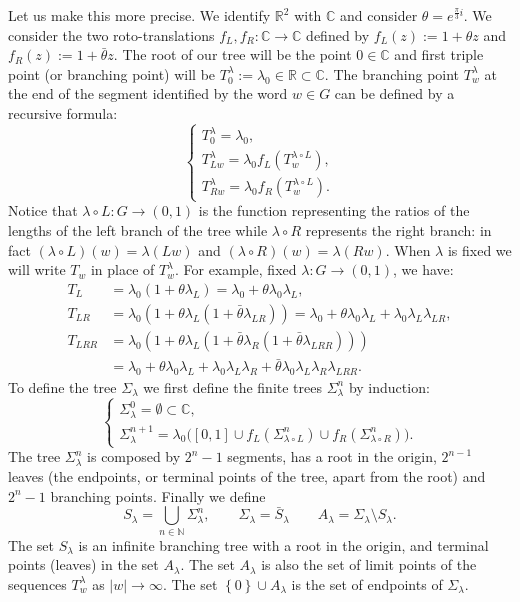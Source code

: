 \documentclass{amsart}
\newcommand{\RR}{\mathbb R}
\newcommand{\CC}{\mathbb C}
\newcommand{\NN}{\mathbb N}
\newcommand{\abs}[1]{\left\vert #1 \right\vert}
\newcommand{\ENCLOSE}[1]{\left\{#1\right\}}
\theoremstyle{definition}
\theoremstyle{remark}
\begin{document}
{Let us make this more precise.
We identify $\RR^2$ with $\CC$ and consider $\theta=e^{\frac{\pi}{3}i}$.
We consider the two roto-translations $f_L,f_R\colon \CC\to \CC$ defined by 
$f_L(z):= 1+\theta z$ and $f_R(z):=1+\bar\theta z$.
The root of our tree will be the point $0\in \CC$ and first triple point (or branching point) will be 
$T_0^\lambda:=\lambda_0\in \RR\subset \CC$. 
The branching point $T_w^\lambda$ at the end of the segment identified by the word $w\in G$ can be defined by a recursive formula:
\[
   \begin{cases}
    T_0^\lambda = \lambda_0, \\
    T_{Lw}^\lambda = \lambda_0 f_L(T_w^{\lambda\circ L}), \\
    T_{Rw}^\lambda = \lambda_0 f_R(T_w^{\lambda\circ L}).
   \end{cases}
\]
Notice that $\lambda\circ L\colon G \to (0,1)$ is the function representing the ratios of the lengths of the left branch of the tree 
while $\lambda\circ R$ represents the right branch: 
in fact $(\lambda\circ L)(w) = \lambda(Lw)$ and $(\lambda\circ R)(w) = \lambda(Rw)$.
When $\lambda$ is fixed we will write $T_w$ in place of $T_w^\lambda$.
For example, fixed $\lambda\colon G\to(0,1)$, we have: 
\begin{align*}
  T_L &= \lambda_0 (1+\theta \lambda_L) = \lambda_0+\theta \lambda_0\lambda_L,\\
  T_{LR} &= \lambda_0(1+\theta\lambda_L(1+\bar \theta\lambda_{LR})) 
    = \lambda_0 + \theta \lambda_0\lambda_L + \lambda_0\lambda_L\lambda_{LR},\\
  T_{LRR} &= \lambda_0 (1+ \theta \lambda_L(1+\bar \theta \lambda_R(1+\bar \theta \lambda_{LRR}))) \\
    &= \lambda_0 + \theta \lambda_0\lambda_L + \lambda_0\lambda_L\lambda_R + \bar\theta \lambda_0\lambda_L\lambda_R\lambda_{LRR}.
\end{align*}
To define the tree $\Sigma_\lambda$ we first define the finite trees $\Sigma_\lambda^n$ by induction:
\[
\begin{cases}
  \Sigma_\lambda^0 = \emptyset \subset \CC, \\
  \Sigma_\lambda^{n+1} = \lambda_0\big([0,1] \cup f_L(\Sigma_{\lambda\circ L}^n) \cup f_R(\Sigma_{\lambda\circ R}^n)\big).
\end{cases}
\]
The tree $\Sigma_\lambda^n$ is composed by $2^n-1$ segments, has a root in the origin, 
$2^{n-1}$ leaves
(the endpoints, or terminal points of the tree, apart from the root)
and $2^n-1$ branching points.
Finally we define
\[
  S_\lambda = \bigcup_{n\in \NN} \Sigma_\lambda^n,
  \qquad
  \Sigma_\lambda = \bar S_\lambda
  \qquad
  A_\lambda = \Sigma_\lambda \setminus S_\lambda.
\]
The set $S_\lambda$ is an infinite branching tree with a root in the origin, 
and terminal points (leaves) in the set $A_\lambda$.
The set $A_\lambda$ is also the set of limit points of the sequences $T^\lambda_w$ as $\abs{w}\to\infty$. 
The set $\ENCLOSE{0}\cup A_\lambda$ is the set of endpoints of $\Sigma_\lambda$.

}
\end{document}
